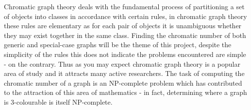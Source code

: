 \documentclass[12pt, a4paper]{article}
\begin{document}
\par
Chromatic graph theory deals with the fundamental process of partitioning a set of objects into classes in accordance with certain rules, in chromatic graph theory these rules are elementary as for each pair of objects it is unambiguous whether they may exist together in the same class. Finding the chromatic number of both generic and special-case graphs will be the theme of this project, despite the simplicity of the rules this does not indicate the problems encountered are simple - on the contrary. Thus as you may expect chromatic graph theory is a popular area of study and it attracts many active researchers. The task of computing the chromatic number of a graph is an NP-complete problem which has contributed to the attraction of this area of mathematics - in fact, determining where a graph is $3$-colourable is itself NP-complete.
\end{document}
